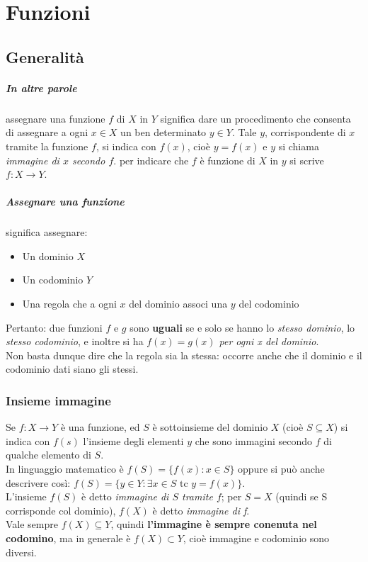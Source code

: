 \documentclass[12pt, a4paper, openany]{book}
\begin{document}
\chapter{Funzioni}

\section{Generalità}
\paragraph{In altre parole} assegnare una funzione $f$ di $X$ in $Y$ significa dare un procedimento che consenta di assegnare a ogni $x \in X$ un ben determinato $y \in Y$. Tale $y$, corrispondente di $x$ tramite la funzione $f$, si indica con $f(x)$, cioè $y = f(x)$ e $y$ si chiama \emph{immagine di $x$ secondo $f$}. per indicare che $f$ è funzione di $X$ in $y$ si scrive $f: X \rightarrow Y$.

\paragraph{Assegnare una funzione} significa assegnare:
\begin{itemize}
	\item Un dominio $X$
	\item Un codominio $Y$
	\item Una regola che a ogni $x$ del dominio associ una $y$ del codominio
\end{itemize}
Pertanto: due funzioni $f$ e $g$ sono \textbf{uguali} se e solo se hanno lo \emph{stesso dominio}, lo\emph{ stesso codominio}, e inoltre si ha \emph{$f(x) = g(x)$ per ogni x del dominio}.\\
Non basta dunque dire che la regola sia la stessa: occorre anche che il dominio e il codominio dati siano gli stessi.

\subsection*{Insieme immagine}
Se $f: X \rightarrow Y$ è una funzione, ed $S$ è sottoinsieme del dominio $X$ (cioè $S \subseteq X$) si indica con $f(s)$ l'insieme degli elementi $y$ che sono immagini secondo $f$ di qualche elemento di $S$.
\\In linguaggio matematico è $f(S) = \{ f(x) : x \in S\}$ oppure si può anche descrivere così: $f(S) = \{y \in Y : \exists x \in S \text{ tc } y = f(x)\}$.
\\L'insieme $f(S)$ è detto \emph{immagine di $S$ tramite $f$}; per $S = X$ (quindi se S corrisponde col dominio), $f(X)$ è detto \emph{immagine di f}.
\\Vale sempre $f(X) \subseteq Y$, quindi \textbf{l'immagine è sempre conenuta nel codomino}, ma in generale è $f(X) \subset Y$, cioè immagine e codominio sono diversi.
\end{document}
